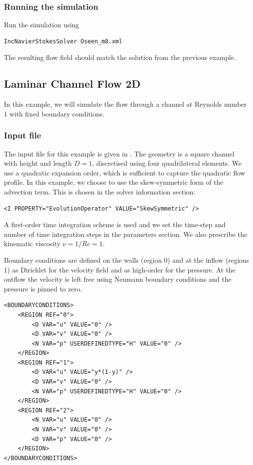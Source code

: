 \subsubsection{Running the simulation}
Run the simulation using
\begin{lstlisting}[style=BashInputStyle]
IncNavierStokesSolver Oseen_m8.xml
\end{lstlisting}

The resulting flow field should match the solution from the previous example.


\subsection{Laminar Channel Flow 2D}
\label{s:incns:LaminarChannelFlow2D}
In this example, we will simulate the flow through a channel at Reynolds number
1 with fixed boundary conditions.

\subsubsection{Input file}
The input file for this example is given in . The
geometry is a square channel with height and length $D=1$, discretised using
four quadrilateral elements. We use a quadratic expansion order, which is
sufficient to capture the quadratic flow profile. In this example, we choose to
use the skew-symmetric form of the advection term. This is chosen in the solver
information section:
\begin{lstlisting}[style=XMLStyle]
<I PROPERTY="EvolutionOperator" VALUE="SkewSymmetric" />
\end{lstlisting}
A first-order time integration scheme is used and we set the time-step and
number of time integration steps in the parameters section. We also prescribe
the kinematic viscosity $\nu = 1/Re = 1$.

Boundary conditions are defined on the walls (region 0) and at the inflow
(regions 1) as Dirichlet for the velocity field and as high-order for the
pressure. At the outflow the velocity is left free using Neumann boundary
conditions and the pressure is pinned to zero.
\begin{lstlisting}[style=XMLStyle]
<BOUNDARYCONDITIONS>
    <REGION REF="0">
        <D VAR="u" VALUE="0" />
        <D VAR="v" VALUE="0" />
        <N VAR="p" USERDEFINEDTYPE="H" VALUE="0" />
    </REGION>
    <REGION REF="1">
        <D VAR="u" VALUE="y*(1-y)" />
        <D VAR="v" VALUE="0" />
        <N VAR="p" USERDEFINEDTYPE="H" VALUE="0" />
    </REGION>
    <REGION REF="2">
        <N VAR="u" VALUE="0" />
        <N VAR="v" VALUE="0" />
        <D VAR="p" VALUE="0" />
    </REGION>
</BOUNDARYCONDITIONS>
\end{lstlisting}


